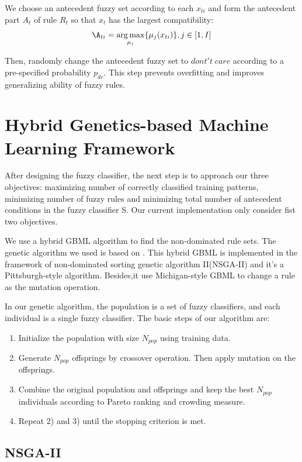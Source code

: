 \documentclass[conference]{IEEEtran}
\begin{document}
  We choose an antecedent fuzzy set according to each $x_{ti}$ and form the antecedent part $A_t$ of rule $R_t$ so that $x_{t}$ has the largest compatibility:
  $$ \A_{ti} = \underset{\mu_j}{\arg\max}\{\mu_{j}(x_{ti})\},j \in [1,I]$$
  
  Then, randomly change the antecedent fuzzy set to $dont't\;care$ according to a pre-specified probability $p_{dc}$. This step prevents overfitting and improves generalizing ability of fuzzy rules.
  \section{Hybrid Genetics-based Machine Learning Framework}
  After designing the fuzzy classifier, the next step is to approach our three objectives: maximizing number of correctly classified training patterns, minimizing number of fuzzy rules and minimizing total number of antecedent conditions in the fuzzy classifier S. Our current implementation only consider fist two objectives.
	 
	 We use a hybrid GBML algorithm to find the non-dominated rule sets. The genetic algorithm we used is based on \cite{ishibuchi2007analysis}. This hybrid GBML is implemented in the framework of non-dominated sorting genetic algorithm II(NSGA-II) and it's a Pittsburgh-style algorithm. Besides,it use Michigan-style GBML to change a rule as the mutation operation. 
	 
  In our genetic algorithm, the population is a set of fuzzy classifiers, and each individual is a single fuzzy classifier. The basic steps of our algorithm are:
  \begin{enumerate}
  \item Initialize the population with size $N_{pop}$ using training data.
  \item Generate $N_{pop}$ offsprings by crossover operation. Then apply mutation on the offsprings.
  \item Combine the original population and offsprings and keep the best $N_{pop}$ individuals according to Pareto ranking and crowding measure.
  \item Repeat 2) and 3) until the stopping criterion is met.
  \end{enumerate}
  
	 
	 \subsection{NSGA-II}
	 
\end{document}
